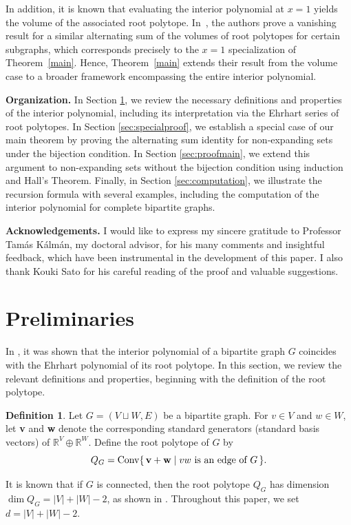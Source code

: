 \documentclass{amsart}
\theoremstyle{definition}
\newtheorem{definition}[theorem]{Definition}
\theoremstyle{remark}
\newcommand{\ack}{\noindent \textbf{Acknowledgements. }}
\newcommand{\org}{\noindent \textbf{Organization. }}
\newcommand{\conv}{\operatorname{Conv}}
\numberwithin{equation}{section}
\begin{document}
In addition, it is known that evaluating the interior polynomial at \(x=1\) yields the volume of the associated root polytope. In~\cite{LP}, the authors prove a vanishing result for a similar alternating sum of the volumes of root polytopes for certain subgraphs, which corresponds precisely to the \(x=1\) specialization of Theorem~\ref{main}. Hence, Theorem~\ref{main} extends their result from the volume case to a broader framework encompassing the entire interior polynomial.


\org In Section \ref{sec:int}, we review the necessary definitions and properties of the interior polynomial, including its interpretation via the Ehrhart series of root polytopes. In Section \ref{sec:specialproof}, we establish a special case of our main theorem by proving the alternating sum identity for non‐expanding sets under the bijection condition. In Section \ref{sec:proofmain}, we extend this argument to non-expanding sets without the bijection condition using induction and Hall’s Theorem. Finally, in Section \ref{sec:computation}, we illustrate the recursion formula with several examples, including the computation of the interior polynomial for complete bipartite graphs.


\ack I would like to express my sincere gratitude to Professor Tam\'as K\'alm\'an, my doctoral advisor, for his many comments and insightful feedback, which have been instrumental in the development of this paper. I also thank Kouki Sato for his careful reading of the proof and valuable suggestions.

\section{Preliminaries}\label{sec:int}
In \cite{KP,kato}, it was shown that the interior polynomial of a bipartite graph $G$ coincides with the Ehrhart polynomial of its root polytope. In this section, we review the relevant definitions and properties, beginning with the definition of the root polytope.


\begin{definition}
Let $G=(V\sqcup W, E)$ be a bipartite graph. For $v \in V$ and $w \in W$, let {\bf v} and {\bf w} denote the corresponding standard generators (standard basis vectors) of $\mathbb{R}^V \oplus \mathbb{R}^W$. Define the root polytope of $G$ by
\[
Q_G=\conv \{\, {\bf v} + {\bf w} \mid vw \mbox{ is an edge of }G \,\}.
\]
\end{definition}

It is known that if $G$ is connected, then the root polytope $Q_G$ has dimension $\dim Q_G = |V| + |W| - 2$, as shown in \cite{P}. Throughout this paper, we set $d = |V| + |W| - 2$.
\end{document}
